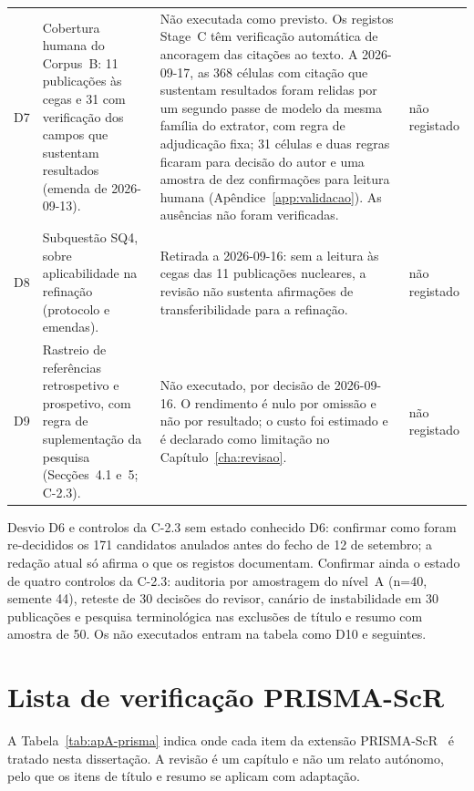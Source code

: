 {\begin{xltabular}{\linewidth}{@{}l>{\raggedright\arraybackslash}X>{\raggedright\arraybackslash}Xl@{}}
D7 & Cobertura humana do Corpus~B: 11 publicações às cegas e 31 com verificação dos campos que sustentam resultados (emenda de 2026-09-13). & Não executada como previsto. Os registos Stage~C têm verificação automática de ancoragem das citações ao texto. A 2026-09-17, as 368 células com citação que sustentam resultados foram relidas por um segundo passe de modelo da mesma família do extrator, com regra de adjudicação fixa; 31 células e duas regras ficaram para decisão do autor e uma amostra de dez confirmações para leitura humana (Apêndice~\ref{app:validacao}). As ausências não foram verificadas. & não registado \\
D8 & Subquestão SQ4, sobre aplicabilidade na refinação (protocolo e emendas). & Retirada a 2026-09-16: sem a leitura às cegas das 11 publicações nucleares, a revisão não sustenta afirmações de transferibilidade para a refinação. & não registado \\
D9 & Rastreio de referências retrospetivo e prospetivo, com regra de suplementação da pesquisa (Secções~4.1 e~5; C-2.3). & Não executado, por decisão de 2026-09-16. O rendimento é nulo por omissão e não por resultado; o custo foi estimado e é declarado como limitação no Capítulo~\ref{cha:revisao}. & não registado \\
\end{xltabular}
}

{Desvio D6 e controlos da C-2.3 sem estado conhecido}
{D6: confirmar como foram re-decididos os 171 candidatos anulados antes do fecho de 12 de setembro; a redação atual só afirma o que os registos documentam. Confirmar ainda o estado de quatro controlos da C-2.3: auditoria por amostragem do nível~A (n=40, semente 44), reteste de 30 decisões do revisor, canário de instabilidade em 30 publicações e pesquisa terminológica nas exclusões de título e resumo com amostra de 50. Os não executados entram na tabela como D10 e seguintes.}

\section{Lista de verificação PRISMA-ScR}
\label{sec:apA-prisma}

A Tabela~\ref{tab:apA-prisma} indica onde cada item da extensão PRISMA-ScR~\cite{Tricco2018} é tratado nesta dissertação. A revisão é um capítulo e não um relato autónomo, pelo que os itens de título e resumo se aplicam com adaptação.

